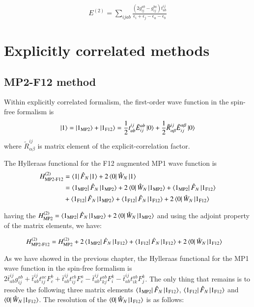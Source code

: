 \documentclass[journal=jacsat]{achemso}
\numberwithin{equation}{section}
\begin{document}
\begin{align}
E^{(2)}=\sum_{ijab}\frac{(2g^{ab}_{ij}-g^{ba}_{ij})t^{ij}_{ab}}{\epsilon_{i}+\epsilon_{j}-\epsilon_{a}-\epsilon_{b}}
\end{align} 

\section{Explicitly correlated methods}

\subsection{MP2-F12 method}
Within explicitly correlated formalism, the first-order wave function in the spin-free formalism is
\begin{align}
\ket{1}=\ket{1_{\text{MP2}}}+\ket{1_{\text{F12}}}=\frac{1}{2}t^{ij}_{ab}\tilde{E}^{ab}_{ij}\ket{0}+\frac{1}{2}\tilde{R}^{ij}_{\alpha\beta}\tilde{E}^{\alpha\beta}_{ij}\ket{0}
\end{align} 
where $\tilde{R}^{ij}_{\alpha\beta}$ is matrix element of the explicit-correlation factor.

The Hylleraas functional for the F12 augmented MP1 wave function is
\begin{align}
H^{(2)}_{\text{MP2-F12}}&=\bra{1}\hat{F}_{N}\ket{1}+2\bra{0}\hat{W}_{N}\ket{1}\\
&=\bra{1_{\text{MP2}}}\hat{F}_{N}\ket{1_{\text{MP2}}}+2\bra{0}\hat{W}_{N}\ket{1_{\text{MP2}}}+\bra{1_{\text{MP2}}}\hat{F}_{N}\ket{1_{\text{F12}}}\\
&+\bra{1_{\text{F12}}}\hat{F}_{N}\ket{1_{\text{MP2}}}+\bra{1_{\text{F12}}}\hat{F}_{N}\ket{1_{\text{F12}}}+2\bra{0}\hat{W}_{N}\ket{1_{\text{F12}}}
\end{align} 

having the $H^{(2)}_{\text{MP2}}=\bra{1_{\text{MP2}}}\hat{F}_{N}\ket{1_{\text{MP2}}}+2\bra{0}\hat{W}_{N}\ket{1_{\text{MP2}}}$ and using the adjoint property of the matrix elements, we have:

\begin{align}
H^{(2)}_{\text{MP2-F12}}&=H^{(2)}_{\text{MP2}}+2\bra{1_{\text{MP2}}}\hat{F}_{N}\ket{1_{\text{F12}}}+\bra{1_{\text{F12}}}\hat{F}_{N}\ket{1_{\text{F12}}}+2\bra{0}\hat{W}_{N}\ket{1_{\text{F12}}}
\end{align} 

As we have showed in the previous chapter, the Hylleraas functional for the MP1 wave function in the spin-free formalism is $2\bar{t}^{ij}_{ab}g^{ab}_{ij}
+\bar{t}^{ij}_{ab}t_{ij}^{ac}F_{c}^{b}+\bar{t}^{ij}_{ab}t_{ij}^{cb}F_{c}
^{a}-\bar{t}^{ij}_{ab}t_{kj}^{ab}F_{i}^{k}-\bar{t}^{ij}_{ab}t_{ik}^{ab}F_{j}^{k}$. The only thing that remains is to resolve the following three matrix elements $\bra{1_{\text{MP2}}}\hat{F}_{N}\ket{1_{\text{F12}}}$, $\bra{1_{\text{F12}}}\hat{F}_{N}\ket{1_{\text{F12}}}$ and $\bra{0}\hat{W}_{N}\ket{1_{\text{F12}}}$. The resolution of the $\bra{0}\hat{W}_{N}\ket{1_{\text{F12}}}$ is as follows:
\end{document}
